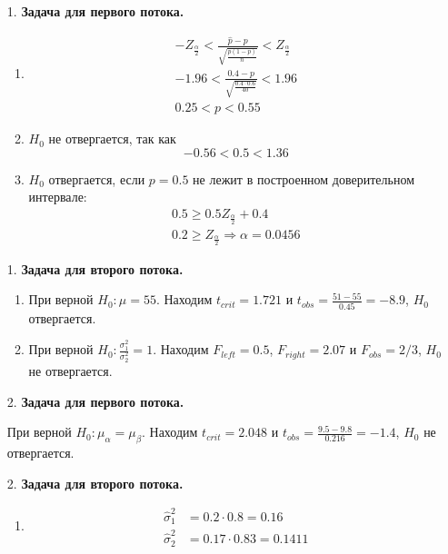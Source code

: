 \begin{enumerate}

\item[1.] \textbf{Задача для первого потока.}

\begin{enumerate}
\item \begin{align*}
-Z_{\frac{\alpha}{2}}<\frac{\hat{p}-p}{\sqrt{\frac{\hat{p}(1-\hat{p})}{n}}}<Z_{\frac{\alpha}{2}} \\
-1.96<\frac{0.4-p}{\sqrt{\frac{0.4\cdot0.6}{40}}}<1.96 \\
0.25 < p < 0.55
\end{align*}

\item $H_0$ не отвергается, так как
\[
-0.56<0.5<1.36
\]

\item $H_0$ отвергается, если $p=0.5$ не лежит в построенном доверительном интервале:
\begin{align*}
0.5\geq0.5Z_{\frac{\alpha}{2}}+0.4 \\
0.2\geq Z_{\frac{\alpha}{2}} \Rightarrow \alpha=0.0456
\end{align*}

\end{enumerate}

\item[1.] \textbf{Задача для второго потока.}
\begin{enumerate}
\item
При верной $H_0: \mu=55$.
Находим $t_{crit} = 1.721$ и $t_{obs} = \frac{51-55}{0.45}= -8.9$, $H_0$ отвергается.

\item
При верной $H_0: \frac{\sigma^2_1}{\sigma^2_2}=1$.
Находим $F_{left} = 0.5$, $F_{right}=2.07$ и $F_{obs} = 2/3$, $H_0$ не отвергается.
\end{enumerate}

\item[2.] \textbf{Задача для первого потока.}

При верной $H_0: \mu_{\alpha}=\mu_{\beta}$.
Находим $t_{crit} = 2.048$ и $t_{obs} =\frac{9.5-9.8}{0.216}= -1.4$, $H_0$ не отвергается.

\item[2.] \textbf{Задача для второго потока.}
\begin{enumerate}
\item
\begin{align*}
\hat{\sigma}^2_1 &= 0.2 \cdot 0.8 = 0.16 \\
\hat{\sigma}^2_2 &= 0.17 \cdot 0.83 = 0.1411
\end{align*}


\end{enumerate}
\end{enumerate}
